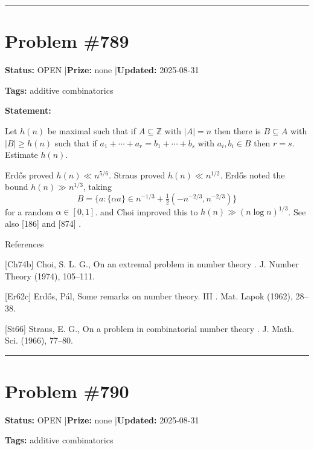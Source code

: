 \documentclass{article}
\begin{document}
\noindent\rule{\linewidth}{0.4pt}


\section{Problem \#789}
\label{prob:789}

\noindent\textbf{Status:} OPEN \quad|\quad \textbf{Prize:} none \quad|\quad \textbf{Updated:} 2025-08-31

\noindent\textbf{Tags:} additive combinatorics

\medskip

\noindent\textbf{Statement:}

Let $h(n)$ be maximal such that if $A\subseteq \mathbb{Z}$ with $\lvert A\rvert=n$ then there is $B\subseteq A$ with $\lvert B\rvert \geq h(n)$ such that if $a_1+\cdots+a_r=b_1+\cdots+b_s$ with $a_i,b_i\in B$ then $r=s$. Estimate $h(n)$.




Erd\H{o}s \cite{Er62c} proved $h(n) \ll n^{5/6}$. Straus \cite{St66} proved $h(n) \ll n^{1/2}$. Erd\H{o}s noted the bound $h(n)\gg n^{1/3}$, taking\[B=\{ a: \{ \alpha a\} \in n^{-1/3}+\tfrac{1}{2} (-n^{-2/3},n^{-2/3})\}\]for a random $\alpha\in [0,1]$. \cite{Er62c} and Choi \cite{Ch74b} improved this to $h(n) \gg (n\log n)^{1/3}$. See also [186] and [874] .




References

[Ch74b] Choi, S. L. G., On an extremal problem in number theory . J. Number Theory (1974), 105--111.

[Er62c] Erd\H{o}s, P\'{a}l, Some remarks on number theory. {III} . Mat. Lapok (1962), 28--38.

[St66] Straus, E. G., On a problem in combinatorial number theory . J. Math. Sci. (1966), 77--80.

\noindent\rule{\linewidth}{0.4pt}


\section{Problem \#790}
\label{prob:790}

\noindent\textbf{Status:} OPEN \quad|\quad \textbf{Prize:} none \quad|\quad \textbf{Updated:} 2025-08-31

\noindent\textbf{Tags:} additive combinatorics

\medskip
\end{document}
